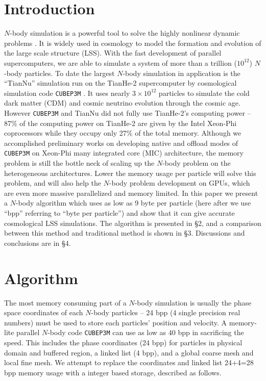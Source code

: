 \documentclass[10pt,twocolumn,preprint]{emulateapj}
\begin{document}
\section{Introduction}
$N$-body simulation is a powerful tool to solve the highly nonlinear dynamic problems \citep{1988csup.book.....H}. It is widely used in cosmology to model the formation and evolution of the large scale structure (LSS). With the fast development of parallel supercomputers, we are able to simulate a system of more than a trillion ($10^{12}$) $N$-body particles. To date the largest $N$-body simulation in application is the ``TianNu'' simulation run on the TianHe-2 supercomputer by cosmological simulation code {\tt CUBEP3M} \citep{2013MNRAS.436..540H}. It uses nearly $3\times 10^{12}$ particles to simulate the cold dark matter (CDM) and cosmic neutrino evolution through the cosmic age. However {\tt CUBEP3M} and TianNu did not fully use TianHe-2's computing power -- 87\% of the computing power on TianHe-2 are given by the Intel Xeon-Phi coprocessors while they occupy only 27\% of the total memory. Although we accomplished preliminary works on developing native and offload modes of {\tt CUBEP3M} on Xeon-Phi many integrated core (MIC) architecture, the memory problem is still the bottle neck of scaling up the $N$-body problem on the heterogeneous architectures. Lower the memory usage per particle will solve this problem, and will also help the $N$-body problem development on GPUs, which are even more massive parallelized and memory limited. In this paper we present a $N$-body algorithm which uses as low as 9 byte per particle (here after we use ``bpp'' referring to ``byte per particle'') and show that it can give accurate cosmological LSS simulations. The algorithm is presented in \S 2, and a comparison between this method and traditional method is shown in \S 3. Discussions and conclusions are in \S 4.

\section{Algorithm}
The most memory consuming part of a $N$-body simulation is usually the phase space coordinates of each $N$-body particles -- 24 bpp (4 single precision real numbers) must be used to store each particles' position and velocity. A memory-lite parallel $N$-body code {\tt CUBEP3M} can use as low as 40 bpp in sacrificing the speed. This includes the phase coordinates (24 bpp) for particles in physical domain and buffered region, a linked list (4 bpp), and a global coarse mesh and local fine mesh. We attempt to replace the coordinates and linked list 24+4=28 bpp memory usage with a integer based storage, described as follows.
\end{document}
